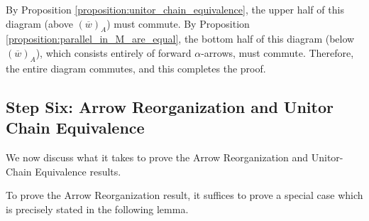 \begin{varprf}
\begin{center}
    \end{center}
    By Proposition \ref{proposition:unitor_chain_equivalence}, the upper half of this diagram (above $(\overline{w})_A$) 
    must commute. By 
    Proposition \ref{proposition:parallel_in_M_are_equal}, 
    the bottom half of this diagram (below $(\overline{w})_A$), which 
    consists entirely of forward $\alpha$-arrows,
    must commute.
    Therefore, the entire diagram commutes, and this completes the proof.
\end{varprf}


\newpage
\subsection*{Step Six: Arrow Reorganization and Unitor Chain Equivalence}
We now discuss what it takes to prove the 
Arrow Reorganization and Unitor-Chain Equivalence results. 

To prove the Arrow Reorganization result, it suffices to prove a special case
which is precisely stated in the following lemma.

